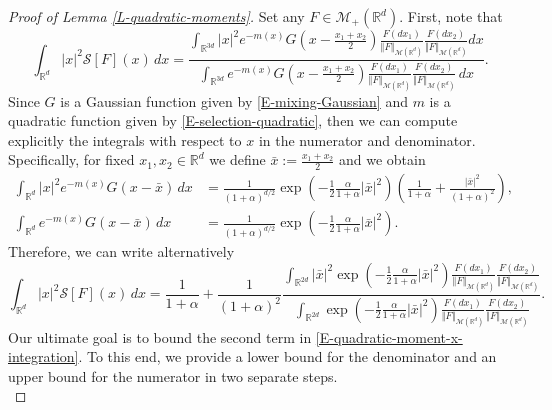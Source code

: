 \documentclass[reqno]{amsart}
\numberwithin{equation}{section}
\begin{document}
{\begin{proof}[Proof of Lemma \ref{L-quadratic-moments}] Set any $F\in \mathcal{M}_+(\mathbb{R}^d)$. First, note that
$$\int_{\mathbb{R}^d}\vert x\vert^2\mathcal{S}[F](x)\,dx=\frac{\displaystyle\int_{\mathbb{R}^{3d}}\vert x\vert^2 e^{-m(x)}G\left(x-\frac{x_1+x_2}{2}\right)\frac{F(dx_1)}{\Vert F\Vert_{\mathcal{M}(\mathbb{R}^d)}}\frac{F(dx_2)}{\Vert F\Vert_{\mathcal{M}(\mathbb{R}^d)}}dx}{\displaystyle\int_{\mathbb{R}^{3d}} e^{-m(x)}G\left(x-\frac{x_1+x_2}{2}\right)\frac{F(dx_1)}{\Vert F\Vert_{\mathcal{M}(\mathbb{R}^d)}}\frac{F(dx_2)}{\Vert F\Vert_{\mathcal{M}(\mathbb{R}^d)}}\,dx}.$$
Since $G$ is a Gaussian function given by  \eqref{E-mixing-Gaussian} and $m$ is a quadratic function given by \eqref{E-selection-quadratic}, then we can compute explicitly the integrals with respect to $x$ in the numerator and denominator. Specifically, for fixed $x_1,x_2\in \mathbb{R}^d$ we define $\bar x:=\frac{x_1+x_2}{2}$ and we obtain
\begin{align*}
\int_{\mathbb{R}^d}\vert x\vert^2 e^{-m(x)}G(x-\bar x)\,dx&=\frac{1}{(1+\alpha)^{d/2}}\exp\left(-\frac{1}{2}\frac{\alpha}{1+\alpha}\vert \bar x\vert^2\right)\left(\frac{1}{1+\alpha}+\frac{\vert \bar x\vert^2}{(1+\alpha)^2}\right),\\
\int_{\mathbb{R}^d} e^{-m(x)}G(x-\bar x)\,dx&=\frac{1}{(1+\alpha)^{d/2}}\exp\left(-\frac{1}{2}\frac{\alpha}{1+\alpha}\vert \bar x\vert^2\right).
\end{align*}
Therefore, we can write alternatively
\begin{equation}\label{E-quadratic-moment-x-integration}
\int_{\mathbb{R}^d}\vert x\vert^2\mathcal{S}[F](x)\,dx=\frac{1}{1+\alpha}+\frac{1}{(1+\alpha)^2}\frac{\displaystyle\int_{\mathbb{R}^{2d}}\vert \bar x\vert^2 \exp\left(-\frac{1}{2}\frac{\alpha}{1+\alpha}\vert \bar x\vert^2\right)\frac{F(dx_1)}{\Vert F\Vert_{\mathcal{M}(\mathbb{R}^d)}}\frac{F(dx_2)}{\Vert F\Vert_{\mathcal{M}(\mathbb{R}^d)}}}{\displaystyle\int_{\mathbb{R}^{2d}}\exp\left(-\frac{1}{2}\frac{\alpha}{1+\alpha}\vert \bar x\vert^2\right)\frac{F(dx_1)}{\Vert F\Vert_{\mathcal{M}(\mathbb{R}^d)}}\frac{F(dx_2)}{\Vert F\Vert_{\mathcal{M}(\mathbb{R}^d)}}}.
\end{equation}
Our ultimate goal is to bound the second term in \eqref{E-quadratic-moment-x-integration}. To this end, we provide a lower bound for the denominator and an upper bound for the numerator in two separate steps.\\


\end{proof}}
\end{document}
